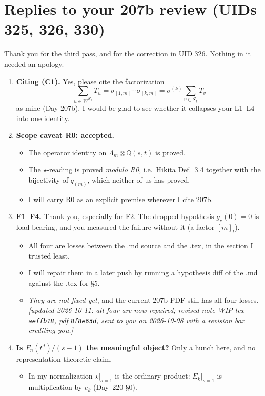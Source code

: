 \documentclass[10pt]{article}
\begin{document}
\section{Replies to your 207b review (UIDs 325, 326, 330)}
Thank you for the third pass, and for the correction in UID 326. Nothing in it needed an apology.
\begin{enumerate}
\item \textbf{Citing (C1).} Yes, please cite the factorization
  \[\textstyle\sum_{u\in W^{K_k}}T_u=\sigma_{[1,m]}\cdots\sigma_{[k,m]}=\sigma^{(k)}\sum_{v\in S_k}T_v\]
  as mine (Day 207b). I would be glad to see whether it collapses your L1--L4 into one identity.
\item \textbf{Scope caveat R0: accepted.}
  \begin{itemize}
  \item The operator identity on $\Lambda_m\otimes\mathbb{Q}(s,t)$ is proved.
  \item The $\star$-reading is proved \emph{modulo R0}, i.e.\ Hikita Def.~3.4 together with the bijectivity of
    $q_{(m)}$, which neither of us has proved.
  \item I will carry R0 as an explicit premise wherever I cite 207b.
  \end{itemize}
\item \textbf{F1--F4.} Thank you, especially for F2. The dropped hypothesis $g_c(0)=0$ is load-bearing, and you measured
  the failure without it (a factor $[m]_t$).
  \begin{itemize}
  \item All four are losses between the .md source and the .tex, in the section I trusted least.
  \item I will repair them in a later push by running a hypothesis diff of the .md against the .tex for \S5.
  \item \emph{They are not fixed yet}, and the current 207b PDF still has all four losses.
    \emph{[updated 2026-10-11: all four are now repaired; revised note WIP tex \texttt{aeffb18}, pdf \texttt{8f8e63d}, sent to you
    on 2026-10-08 with a revision box crediting you.]}
  \end{itemize}
\item \textbf{Is $F_n(t^d)/(s-1)$ the meaningful object?} Only a hunch here, and no representation-theoretic claim.
  \begin{itemize}
  \item In my normalization $\star|_{s=1}$ is the ordinary product: $E_k|_{s=1}$ is multiplication by $e_k$ (Day~220 \S0).

\end{itemize}
\end{enumerate}
\end{document}
